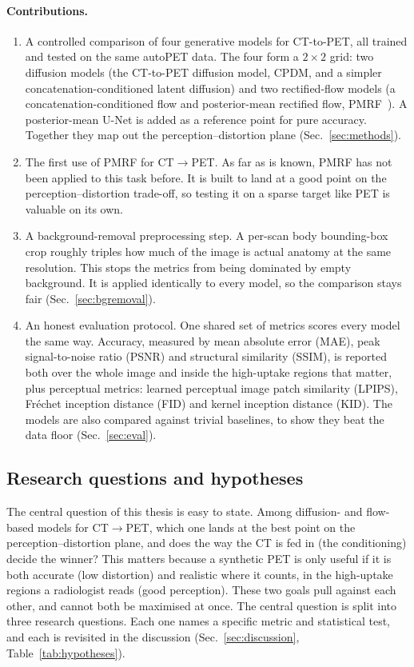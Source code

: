 \documentclass[11pt,a4paper]{article}
\begin{document}
\paragraph{Contributions.}
\begin{enumerate}
  \item A controlled comparison of four generative models for CT-to-PET, all trained
  and tested on the same autoPET data. The four form a $2\times2$ grid: two diffusion models
  (the CT-to-PET diffusion model, CPDM, and a simpler concatenation-conditioned latent diffusion)
  and two rectified-flow models (a concatenation-conditioned flow and posterior-mean rectified
  flow, PMRF~\parencite{ohayon2025pmrf}). A posterior-mean U-Net is added as a reference point for
  pure accuracy. Together they map out the perception--distortion plane (Sec.~\ref{sec:methods}).
  \item The first use of PMRF for CT$\to$PET. As far as
  is known, PMRF has not been applied to this task before. It is built to land at a good point on
  the perception--distortion trade-off, so testing it on a sparse target like PET is valuable on
  its own.
  \item A background-removal preprocessing step. A per-scan body bounding-box crop
  roughly triples how much of the image is actual anatomy at the same resolution. This stops the
  metrics from being dominated by empty background. It is applied identically to every model, so
  the comparison stays fair (Sec.~\ref{sec:bgremoval}).
  \item An honest evaluation protocol. One shared set of metrics scores every model the
  same way. Accuracy, measured by mean absolute error (MAE), peak signal-to-noise ratio (PSNR)
  and structural similarity (SSIM), is reported both over the whole image and inside the
  high-uptake regions that matter, plus perceptual metrics: learned perceptual image patch
  similarity (LPIPS), Fr\'echet inception distance (FID) and kernel inception distance (KID).
  The models are also compared against trivial baselines, to show they beat the data floor
  (Sec.~\ref{sec:eval}).
\end{enumerate}

\subsection{Research questions and hypotheses}
\label{sec:hypotheses}
The central question of this thesis is easy to state. Among diffusion- and flow-based models for
CT$\to$PET, which one lands at the best point on the perception--distortion plane, and does the
way the CT is fed in (the conditioning) decide the winner? This matters because a
synthetic PET is only useful if it is both accurate (low distortion) and realistic where it
counts, in the high-uptake regions a radiologist reads (good perception). These two goals pull
against each other, and cannot both be maximised at once. The central question is split into
three research questions. Each one names a specific metric and statistical test, and each is
revisited in the discussion (Sec.~\ref{sec:discussion}, Table~\ref{tab:hypotheses}).
\end{document}
